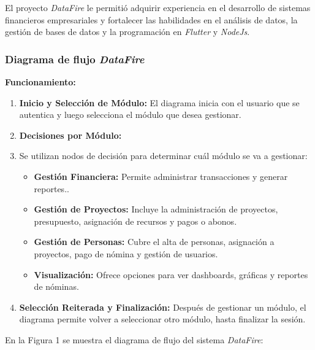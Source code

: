\documentclass[protocolo.tex]{subfiles}
\begin{document}
El proyecto \textit{DataFire} le permitió adquirir experiencia en el desarrollo de sistemas financieros empresariales y fortalecer las habilidades en el análisis de datos, la gestión de bases de datos y la programación en \textit{Flutter} y \textit{NodeJs}.

\subsubsection{Diagrama de flujo \textit{DataFire} }
\textbf{Funcionamiento:}
\begin{enumerate}
    \item \textbf{Inicio y Selección de Módulo:}  
    El diagrama inicia con el usuario que se autentica y luego selecciona el módulo que desea gestionar.
    \item \textbf{Decisiones por Módulo:} 
    \item Se utilizan nodos de decisión para determinar cuál módulo se va a gestionar:
        \begin{itemize}
            \item \textbf{Gestión Financiera:}  Permite administrar transacciones y generar reportes..
            \item \textbf{Gestión de Proyectos:}  Incluye la administración de proyectos, presupuesto, asignación de recursos y pagos o abonos.
            \item \textbf{Gestión de Personas:}  Cubre el alta de personas, asignación a proyectos, pago de nómina y gestión de usuarios.
            \item \textbf{Visualización:} Ofrece opciones para ver dashboards, gráficas y reportes de nóminas.
        \end{itemize}
    \item \textbf{Selección Reiterada y Finalización:} 
    Después de gestionar un módulo, el diagrama permite volver a seleccionar otro módulo, hasta finalizar la sesión.
\end{enumerate}

En la Figura 1 se muestra el diagrama de flujo del sistema \textit{DataFire}:\vspace{2mm}
\end{document}

